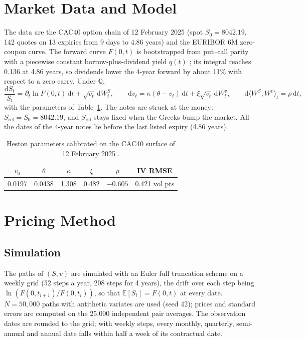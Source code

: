 \documentclass[11pt,a4paper]{article}
\newcommand{\E}{\mathbb{E}}
\newcommand{\Q}{\mathbb{Q}}
\newcommand{\dd}{\mathrm{d}}
\newcommand{\Sref}{S_{\mathrm{ref}}}
\begin{document}
\section{Market Data and Model}\label{sec:model}
The data are the CAC40 option chain of 12 February 2025 (spot $S_0 = 8042.19$, 142 quotes on 13 expiries from
9 days to 4.86 years) and the EURIBOR 6M zero-coupon curve. The forward curve $F(0,t)$ is bootstrapped from
put--call parity with a piecewise constant borrow-plus-dividend yield $q(t)$ \cite{benguedda2026heston}; its
integral reaches 0.136 at 4.86 years, so dividends lower the 4-year forward by about 11\% with respect to a zero
carry. Under $\Q$,
\begin{equation}
\frac{\dd S_t}{S_t} = \partial_t \ln F(0,t)\,\dd t + \sqrt{v_t}\,\dd W^S_t, \qquad
\dd v_t = \kappa(\theta - v_t)\,\dd t + \xi \sqrt{v_t}\,\dd W^v_t, \qquad \dd\langle W^S, W^v\rangle_t = \rho\,\dd t,
\end{equation}
with the parameters of Table~\ref{tab:heston}. The notes are struck at the money: $\Sref = S_0 = 8042.19$, and
$\Sref$ stays fixed when the Greeks bump the market. All the dates of the 4-year notes lie before the last listed
expiry (4.86 years).

\begin{table}[h]
\centering
\begin{tabular}{@{}cccccc@{}}
\toprule
$v_0$ & $\theta$ & $\kappa$ & $\xi$ & $\rho$ & IV RMSE \\
\midrule
0.0197 & 0.0438 & 1.308 & 0.482 & $-0.605$ & 0.421 vol pts \\
\bottomrule
\end{tabular}
\caption{Heston parameters calibrated on the CAC40 surface of 12 February 2025 \cite{benguedda2026heston}.}
\label{tab:heston}
\end{table}


\clearpage
\section{Pricing Method}\label{sec:method}

\subsection{Simulation}
The paths of $(S, v)$ are simulated with an Euler full truncation scheme on a weekly grid (52 steps a year,
208 steps for 4 years), the drift over each step being $\ln(F(0,t_{i+1})/F(0,t_i))$, so that
$\E[S_t] = F(0,t)$ at every date. $N = 50{,}000$ paths with antithetic variates are used (seed 42); prices and
standard errors are computed on the 25{,}000 independent pair averages. The observation dates are rounded to the
grid; with weekly steps, every monthly, quarterly, semi-annual and annual date falls within half a week of its
contractual date.
\end{document}
